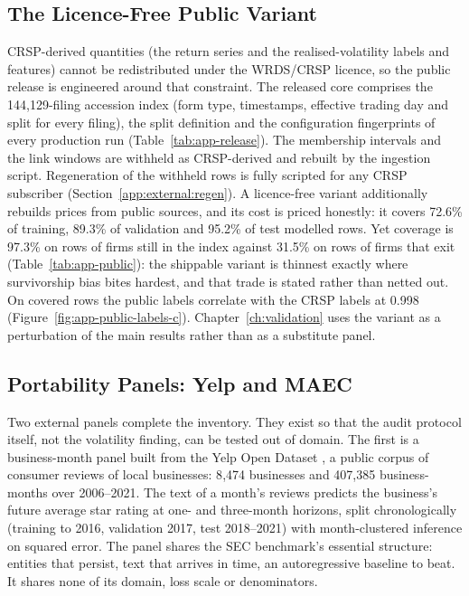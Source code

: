\subsection{The Licence-Free Public Variant}
\label{sec:data-public}

CRSP-derived quantities (the return series and the realised-volatility labels and features) cannot be redistributed under the WRDS/CRSP licence, so the public release is engineered around that constraint. The released core comprises the 144{,}129-filing accession index (form type, timestamps, effective trading day and split for every filing), the split definition and the configuration fingerprints of every production run (Table~\ref{tab:app-release}). The membership intervals and the link windows are withheld as CRSP-derived and rebuilt by the ingestion script. Regeneration of the withheld rows is fully scripted for any CRSP subscriber (Section~\ref{app:external:regen}). %
A licence-free variant additionally rebuilds prices from public sources, and its cost is priced honestly: it covers 72.6\% of training, 89.3\% of validation and 95.2\% of test modelled rows. %
Yet coverage is 97.3\% on rows of firms still in the index against 31.5\% on rows of firms that exit (Table~\ref{tab:app-public}): the shippable variant is thinnest exactly where survivorship bias bites hardest, and that trade is stated rather than netted out. %
On covered rows the public labels correlate with the CRSP labels at 0.998 (Figure~\ref{fig:app-public-labels-c}). Chapter~\ref{ch:validation} uses the variant as a perturbation of the main results rather than as a substitute panel. %

\subsection{Portability Panels: Yelp and MAEC}
\label{sec:data-portability}

Two external panels complete the inventory. They exist so that the audit protocol itself, not the volatility finding, can be tested out of domain. The first is a business-month panel built from the Yelp Open Dataset \cite{yelp2024dataset}, a public corpus of consumer reviews of local businesses: 8{,}474 businesses and 407{,}385 business-months over 2006--2021. The text of a month's reviews predicts the business's future average star rating at one- and three-month horizons, split chronologically (training to 2016, validation 2017, test 2018--2021) with month-clustered inference on squared error. %
The panel shares the SEC benchmark's essential structure: entities that persist, text that arrives in time, an autoregressive baseline to beat. It shares none of its domain, loss scale or denominators.

